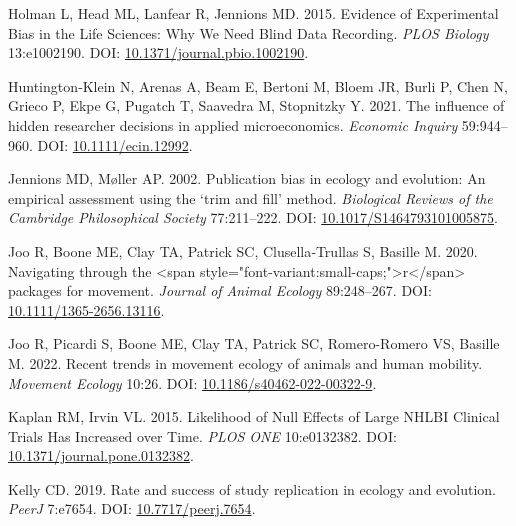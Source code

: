 \documentclass[10pt,a4paper]{article}
\newlength{\cslhangindent}
\newlength{\cslentryspacingunit} %
\newenvironment{CSLReferences}[2] %
 {%
  \setlength{\parindent}{0pt}
  \ifodd #1
  \let\oldpar\par
  \def\par{\hangindent=\cslhangindent\oldpar}
  \fi
  \setlength{\parskip}{#2\cslentryspacingunit}
 }%
 {}
\begin{document}
\begin{CSLReferences}{1}{0}
\leavevmode{}%
Holman L, Head ML, Lanfear R, Jennions MD. 2015. Evidence of {Experimental} {Bias} in the {Life} {Sciences}: {Why} {We} {Need} {Blind} {Data} {Recording}. \emph{PLOS Biology} 13:e1002190. DOI: \href{https://doi.org/10.1371/journal.pbio.1002190}{10.1371/journal.pbio.1002190}.

\leavevmode{}%
Huntington‐Klein N, Arenas A, Beam E, Bertoni M, Bloem JR, Burli P, Chen N, Grieco P, Ekpe G, Pugatch T, Saavedra M, Stopnitzky Y. 2021. The influence of hidden researcher decisions in applied microeconomics. \emph{Economic Inquiry} 59:944--960. DOI: \href{https://doi.org/10.1111/ecin.12992}{10.1111/ecin.12992}.

\leavevmode{}%
Jennions MD, Møller AP. 2002. Publication bias in ecology and evolution: An empirical assessment using the `trim and fill' method. \emph{Biological Reviews of the Cambridge Philosophical Society} 77:211--222. DOI: \href{https://doi.org/10.1017/S1464793101005875}{10.1017/S1464793101005875}.

\leavevmode{}%
Joo R, Boone ME, Clay TA, Patrick SC, Clusella‐Trullas S, Basille M. 2020. Navigating through the {\textless{}}span style="font-variant:small-caps;"{\textgreater{}}r{\textless{}}/span{\textgreater{}} packages for movement. \emph{Journal of Animal Ecology} 89:248--267. DOI: \href{https://doi.org/10.1111/1365-2656.13116}{10.1111/1365-2656.13116}.

\leavevmode{}%
Joo R, Picardi S, Boone ME, Clay TA, Patrick SC, Romero-Romero VS, Basille M. 2022. Recent trends in movement ecology of animals and human mobility. \emph{Movement Ecology} 10:26. DOI: \href{https://doi.org/10.1186/s40462-022-00322-9}{10.1186/s40462-022-00322-9}.

\leavevmode{}%
Kaplan RM, Irvin VL. 2015. Likelihood of {Null} {Effects} of {Large} {NHLBI} {Clinical} {Trials} {Has} {Increased} over {Time}. \emph{PLOS ONE} 10:e0132382. DOI: \href{https://doi.org/10.1371/journal.pone.0132382}{10.1371/journal.pone.0132382}.

\leavevmode{}%
Kelly CD. 2019. Rate and success of study replication in ecology and evolution. \emph{PeerJ} 7:e7654. DOI: \href{https://doi.org/10.7717/peerj.7654}{10.7717/peerj.7654}.


\end{CSLReferences}
\end{document}
